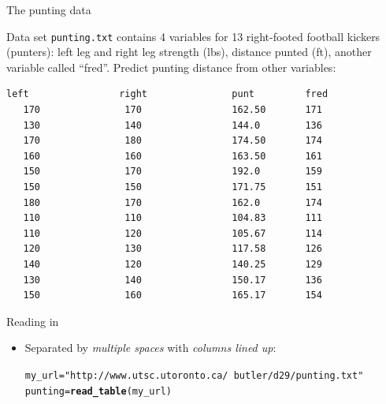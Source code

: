 \documentclass[unknownkeysallowed]{beamer}\usepackage[]{graphicx}\usepackage[]{color}
\makeatletter
\newcommand{\hlstr}[1]{\textcolor[rgb]{0.192,0.494,0.8}{#1}}%
\newcommand{\hlstd}[1]{\textcolor[rgb]{0.345,0.345,0.345}{#1}}%
\newcommand{\hlkwb}[1]{\textcolor[rgb]{0.69,0.353,0.396}{#1}}%
\newcommand{\hlkwd}[1]{\textcolor[rgb]{0.737,0.353,0.396}{\textbf{#1}}}%
\newenvironment{kframe}{%
 \def\at@end@of@kframe{}%
 \ifinner\ifhmode%
  \def\at@end@of@kframe{\end{minipage}}%
  \begin{minipage}{\columnwidth}%
 \fi\fi%
 \def\FrameCommand##1{\hskip\@totalleftmargin \hskip-\fboxsep
 \colorbox{shadecolor}{##1}\hskip-\fboxsep
     \hskip-\linewidth \hskip-\@totalleftmargin \hskip\columnwidth}%
 \MakeFramed {\advance\hsize-\width
   \@totalleftmargin\z@ \linewidth\hsize
   \@setminipage}}%
 {\par\unskip\endMakeFramed%
 \at@end@of@kframe}
\newenvironment{knitrout}{}{} %
\makeatother
\begin{document}
\begin{frame}[fragile]{The punting data}

  Data set \verb-punting.txt- contains 4 variables for 13 right-footed
  football kickers (punters): left leg and right leg strength (lbs),
  distance punted (ft), another variable called ``fred''. Predict
  punting distance from other variables:

  \begin{scriptsize}
\begin{verbatim}
left                right               punt         fred
   170               170                162.50       171 
   130               140                144.0        136   
   170               180                174.50       174 
   160               160                163.50       161 
   150               170                192.0        159 
   150               150                171.75       151 
   180               170                162.0        174 
   110               110                104.83       111 
   110               120                105.67       114 
   120               130                117.58       126 
   140               120                140.25       129  
   130               140                150.17       136 
   150               160                165.17       154 
\end{verbatim}
    
  \end{scriptsize}
  
  
  
  
\end{frame}

\begin{frame}[fragile]{Reading in}
  
  \begin{itemize}
  \item Separated by \emph{multiple spaces} with \emph{columns lined up}:
    
\begin{knitrout}
\color{fgcolor}\begin{kframe}
\begin{alltt}
\hlstd{my_url}\hlkwb{=}\hlstr{"http://www.utsc.utoronto.ca/~butler/d29/punting.txt"}
\hlstd{punting}\hlkwb{=}\hlkwd{read_table}\hlstd{(my_url)}
\end{alltt}


{\ttfamily\noindent\itshape\color{messagecolor}{\#\# Parsed with column specification:\\\#\# cols(\\\#\#\ \  left = col\_double(),\\\#\#\ \  right = col\_double(),\\\#\#\ \  punt = col\_double(),\\\#\#\ \  fred = col\_double()\\\#\# )}}\end{kframe}
\end{knitrout}
  \end{itemize}
  
\end{frame}
\end{document}
